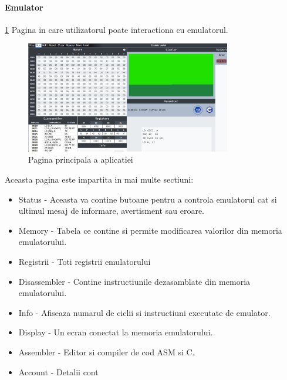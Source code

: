 \documentclass[titlepage,12pt]{article}
\begin{document}
\paragraph {Emulator} \cref {fig:emulatorpage} Pagina in care utilizatorul poate interactiona cu emulatorul.
\begin{figure}[h!]
    \centering
    \includegraphics[width=0.8\textwidth]{images/emulatorpage.png}
    \caption{Pagina principala a aplicatiei}
    \label{fig:emulatorpage}
\end{figure}

Aceasta pagina este impartita in mai multe sectiuni:
\begin{itemize}
    \item {Status} - Aceasta va contine butoane pentru a controla emulatorul cat si ultimul mesaj de informare, avertisment sau eroare.
    \item {Memory} - Tabela ce contine si permite modificarea valorilor din memoria emulatorului.
    \item {Registrii} - Toti registrii emulatorului
    \item {Disassembler} - Contine instructiunile dezasamblate din memoria emulatorului.
    \item {Info} - Afiseaza numarul de ciclii si instructiuni executate de emulator.
    \item {Display} - Un ecran conectat la memoria emulatorului.
    \item {Assembler} - Editor si compiler de cod ASM si C.
    \item {Account} - Detalii cont
\end{itemize}
\end{document}
